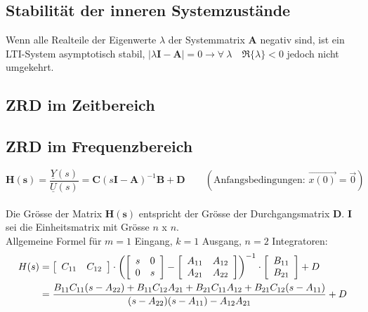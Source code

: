 \subsection{Stabilität der inneren Systemzustände }
  Wenn alle Realteile der Eigenwerte $\lambda$ der Systemmatrix ${\boldsymbol A}$
  negativ sind, ist ein LTI-System asymptotisch stabil, \newline
  $\left | \lambda\boldsymbol{I} - \boldsymbol{A} \right |   =0 \rightarrow \forall~\lambda \quad\Re \{\lambda\}<0$
  jedoch nicht umgekehrt. 

\subsection{ZRD im Zeitbereich }

\subsection{ZRD im Frequenzbereich  }
  \[ \boldsymbol{H(s)} = \frac{\underline{Y}(s)}{\underline{U}(s)} =
  \boldsymbol{C}\left(s\boldsymbol{I}-\boldsymbol{A}\right)^{-1}\boldsymbol{B}+\boldsymbol{D} \qquad
   (\text{Anfangsbedingungen: } \vec{x(0)} = \vec 0) \]
  \\
  Die Grösse der Matrix $\boldsymbol {H(s)}$ entspricht der Grösse der
  Durchgangsmatrix $\boldsymbol D$. $\boldsymbol{I}$ sei die Einheitsmatrix mit
  Grösse $n$ x $n$. \\
  
  Allgemeine Formel für $m=1$ Eingang, $k=1$ Ausgang, $n=2$ Integratoren:  
  \begin{align*}
    H(s) &= \left[
    \begin{array}{c c}
      C_{11}  & C_{12}\\
    \end{array}
    \right] \cdot \left( \left[
    \begin{array}{cc}
      s & 0\\
      0 & s\\
    \end{array}
    \right] - \left[
    \begin{array}{cc}
      A_{11} & A_{12}\\
      A_{21} & A_{22}\\
    \end{array}
    \right] \right)^{-1} \cdot \left[
    \begin{array}{c}
      B_{11}\\
      B_{21}\\
    \end{array}
    \right ]+ D \\
    &=  \frac{B_{11}C_{11}(s-A_{22}) + B_{11}C_{12}A_{21} + B_{21}C_{11}A_{12} + B_{21}C_{12}(s-A_{11})}
		{(s-A_{22})(s-A_{11}) - A_{12}A_{21}} + D
  \end{align*}

